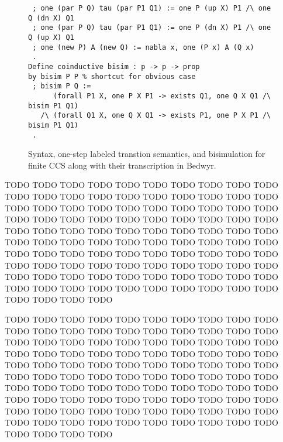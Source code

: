 \documentclass{llncs}
\begin{document}
\begin{figure}
\begin{verbatim}
 ; one (par P Q) tau (par P1 Q1) := one P (up X) P1 /\ one Q (dn X) Q1
 ; one (par P Q) tau (par P1 Q1) := one P (dn X) P1 /\ one Q (up X) Q1
 ; one (new P) A (new Q) := nabla x, one (P x) A (Q x)
 .
Define coinductive bisim : p -> p -> prop
by bisim P P % shortcut for obvious case
 ; bisim P Q :=
      (forall P1 X, one P X P1 -> exists Q1, one Q X Q1 /\ bisim P1 Q1)
   /\ (forall Q1 X, one Q X Q1 -> exists P1, one P X P1 /\ bisim P1 Q1)
 .
\end{verbatim}
\vspace*{-3ex}
\caption{Syntax, one-step labeled transtion semantics, and bisimulation
  for finite CCS along with their transcription in Bedwyr.}
\label{fig:ccsdef}
\end{figure}

TODO TODO TODO TODO TODO TODO TODO TODO TODO TODO TODO TODO TODO
TODO TODO TODO TODO TODO TODO TODO TODO TODO TODO TODO TODO TODO
TODO TODO TODO TODO TODO TODO TODO TODO TODO TODO TODO TODO TODO
TODO TODO TODO TODO TODO TODO TODO TODO TODO TODO TODO TODO TODO
TODO TODO TODO TODO TODO TODO TODO TODO TODO TODO TODO TODO TODO
TODO TODO TODO TODO TODO TODO TODO TODO TODO TODO TODO TODO TODO
TODO TODO TODO TODO TODO TODO TODO TODO TODO TODO TODO TODO TODO
TODO TODO TODO TODO TODO TODO TODO TODO TODO TODO TODO TODO TODO

TODO TODO TODO TODO TODO TODO TODO TODO TODO TODO TODO TODO TODO
TODO TODO TODO TODO TODO TODO TODO TODO TODO TODO TODO TODO TODO
TODO TODO TODO TODO TODO TODO TODO TODO TODO TODO TODO TODO TODO
TODO TODO TODO TODO TODO TODO TODO TODO TODO TODO TODO TODO TODO
TODO TODO TODO TODO TODO TODO TODO TODO TODO TODO TODO TODO TODO
TODO TODO TODO TODO TODO TODO TODO TODO TODO TODO TODO TODO TODO
TODO TODO TODO TODO TODO TODO TODO TODO TODO TODO TODO TODO TODO
TODO TODO TODO TODO TODO TODO TODO TODO TODO TODO TODO TODO TODO
\end{document}
